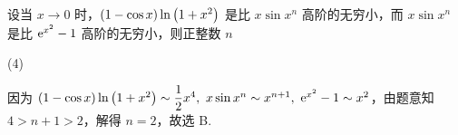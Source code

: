 \begin{example}[2001 数二]
    设当 $x\to0 $ 时，$(1-\cos x)\ln\qty(1+x^2)$ 是比 $x\sin x^n$ 高阶的无穷小，而 $x\sin x^n$ 是比 $\mathrm{e} ^{x^2}-1$ 高阶的无穷小，则正整数 $n$ 
    \begin{tasks}(4)
    \end{tasks}
\end{example}
\begin{solution}
    因为 $(1-\cos x)\ln\qty(1+x^2)\sim\dfrac{1}{2}x^4,~x\sin x^n\sim x^{n+1},~\mathrm{e} ^{x^2}-1\sim x^2$，由题意知 $4>n+1>2$，解得 $n=2$，故选 B.
\end{solution}